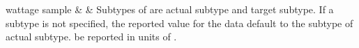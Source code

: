 \begin{longtabu}
\gls{wattage sample}
&
&
\newline Subtypes of  are \gls{actual subtype} and \gls{target subtype}.
\newline If a \gls{subtype} is not specified, the reported value
for the data \MUST default to the \gls{subtype} of
\gls{actual subtype}.
\newline {} \MUST be reported in units of .
\\ \hline 


\end{longtabu}